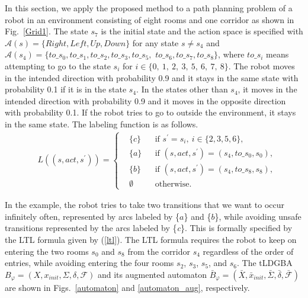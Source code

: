 In this section,
we apply the proposed method to a path planning problem of a robot in an environment consisting of eight rooms and one corridor as shown in Fig.\ \ref{Grid1}. The state $s_7$ is the initial state and the action space is specified with $\mathcal{A}(s) = \{ Right, Left, Up, Down \}$ for any state $s \neq s_4$ and $\mathcal{A}(s_4) = \{ to\_s_0, to\_s_1, to\_s_2, to\_s_3, to\_s_5, $ $to\_s_6, to\_s_7, to\_s_8 \}$, where $to\_s_i$ means attempting to go to the state $s_i$ for $i \in \{0,\ 1,\ 2,\ 3,\ 5,\ 6,\ 7,\ 8 \}$. The robot moves in the intended direction with probability 0.9 and it stays in the same state with probability 0.1 if it is in the state $s_4$. In the states other than $s_4$, it moves in the intended direction with probability 0.9 and it moves in the opposite direction with probability 0.1. If the robot tries to go to outside the environment, it stays in the same state. The labeling function is as follows.
\begin{align*}
      & L((s, act, s^{\prime})) =
      \left\{
      \begin{aligned}
        & \{ c \} &  & \text{if }s^{\prime} = s_i,\ i \in \{ 2,3,5,6 \}, \nonumber \\
        & \{ a \} &  & \text{if }(s,act,s^{\prime})=(s_4,to\_s_0,s_0), \nonumber \\
        & \{ b \} &  & \text{if }(s,act,s^{\prime})=(s_4,to\_s_8, s_8), \nonumber \\
        & \emptyset &  & \text{otherwise}.
      \end{aligned}
      \right.
    \end{align*}

In the example, the robot tries to take two transitions that we want to occur infinitely often, represented by arcs labeled by \{$a$\} and \{$b$\}, while avoiding unsafe transitions represented by the arcs labeled by \{{\it c}\}. This is formally specified by the LTL formula given by (\ref{ltl}).
The LTL formula requires the robot to keep on entering the two rooms $s_0$ and $s_8$ from the corridor $s_4$ regardless of the order of entries, while avoiding entering the four rooms $s_2$, $s_3$, $s_5$, and $s_6$.
The tLDGBA $B_{\varphi} = (X, x_{init},\Sigma,\delta,\mathcal{F})$ and its augmented automaton $\bar{B}_{\varphi} = (\bar{X},\bar{x}_{init},\bar{\Sigma},\bar{\delta},\bar{\mathcal{F}})$ are shown in Figs.\ \ref{automaton} and \ref{automaton_aug}, respectively.

